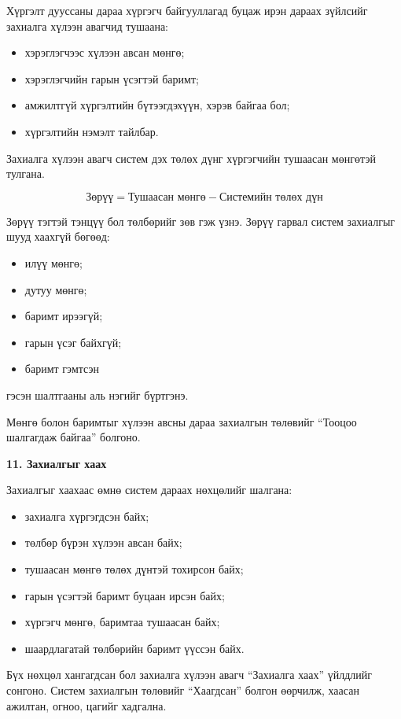 Хүргэлт дууссаны дараа хүргэгч байгууллагад буцаж ирэн дараах зүйлсийг захиалга хүлээн авагчид тушаана:

\begin{itemize}
    \item хэрэглэгчээс хүлээн авсан мөнгө;
    \item хэрэглэгчийн гарын үсэгтэй баримт;
    \item амжилтгүй хүргэлтийн бүтээгдэхүүн, хэрэв байгаа бол;
    \item хүргэлтийн нэмэлт тайлбар.
\end{itemize}

Захиалга хүлээн авагч систем дэх төлөх дүнг хүргэгчийн тушаасан мөнгөтэй тулгана.

$$ \text{Зөрүү}=\text{Тушаасан мөнгө}-\text{Системийн төлөх дүн} $$

Зөрүү тэгтэй тэнцүү бол төлбөрийг зөв гэж үзнэ. Зөрүү гарвал систем захиалгыг шууд хаахгүй бөгөөд:

\begin{itemize}
    \item илүү мөнгө;
    \item дутуу мөнгө;
    \item баримт ирээгүй;
    \item гарын үсэг байхгүй;
    \item баримт гэмтсэн
\end{itemize}
гэсэн шалтгааны аль нэгийг бүртгэнэ.

Мөнгө болон баримтыг хүлээн авсны дараа захиалгын төлөвийг “Тооцоо шалгагдаж байгаа” болгоно.

\textbf{11. Захиалгыг хаах}

Захиалгыг хаахаас өмнө систем дараах нөхцөлийг шалгана:

\begin{itemize}
    \item захиалга хүргэгдсэн байх;
    \item төлбөр бүрэн хүлээн авсан байх;
    \item тушаасан мөнгө төлөх дүнтэй тохирсон байх;
    \item гарын үсэгтэй баримт буцаан ирсэн байх;
    \item хүргэгч мөнгө, баримтаа тушаасан байх;
    \item шаардлагатай төлбөрийн баримт үүссэн байх.
\end{itemize}

Бүх нөхцөл хангагдсан бол захиалга хүлээн авагч “Захиалга хаах” үйлдлийг сонгоно. Систем захиалгын төлөвийг “Хаагдсан” болгон өөрчилж, хаасан ажилтан, огноо, цагийг хадгална.

